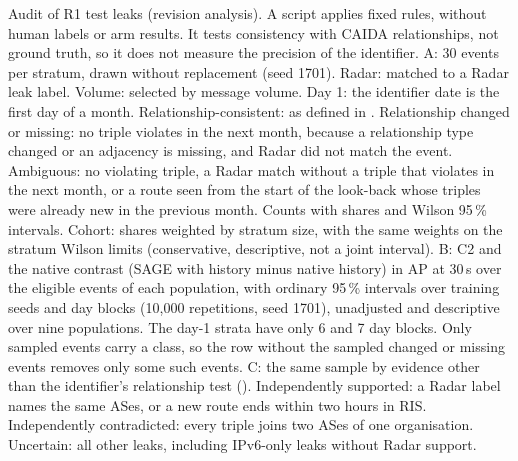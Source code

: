 \begin{table}[h]
\footnotesize
\centering
\caption{Audit of R1 test leaks (revision analysis). A script applies fixed rules, without human labels or arm results. It tests consistency with CAIDA relationships, not ground truth, so it does not measure the precision of the identifier. A: 30 events per stratum, drawn without replacement (seed 1701). Radar: matched to a Radar leak label. Volume: selected by message volume. Day 1: the identifier date is the first day of a month. Relationship-consistent: as defined in . Relationship changed or missing: no triple violates in the next month, because a relationship type changed or an adjacency is missing, and Radar did not match the event. Ambiguous: no violating triple, a Radar match without a triple that violates in the next month, or a route seen from the start of the look-back whose triples were already new in the previous month. Counts with shares and Wilson 95\,\% intervals. Cohort: shares weighted by stratum size, with the same weights on the stratum Wilson limits (conservative, descriptive, not a joint interval). B: C2 and the native contrast (SAGE with history minus native history) in AP at 30\,s over the eligible events of each population, with ordinary 95\,\% intervals over training seeds and day blocks (10,000 repetitions, seed 1701), unadjusted and descriptive over nine populations. The day-1 strata have only 6 and 7 day blocks. Only sampled events carry a class, so the row without the sampled changed or missing events removes only some such events. C: the same sample by evidence other than the identifier's relationship test (). Independently supported: a Radar label names the same ASes, or a new route ends within two hours in RIS. Independently contradicted: every triple joins two ASes of one organisation. Uncertain: all other leaks, including IPv6-only leaks without Radar support.}
\label{tab:leak-audit}

\end{table}
